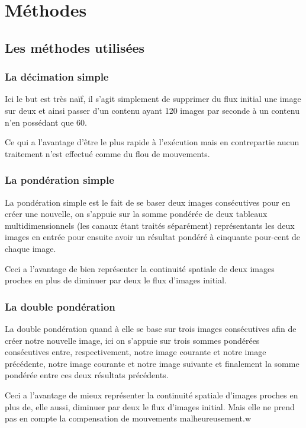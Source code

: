 \documentclass[fleqn,10pt]{SelfArx} %
\begin{document}

\section{Méthodes}

\subsection{Les méthodes utilisées}

\subsubsection{La décimation simple}
Ici le but est très naïf, il s'agit simplement de supprimer du flux initial une image sur deux et ainsi passer d'un contenu ayant 120 images par seconde à un contenu n'en possédant que 60.

Ce qui a l'avantage d'être le plus rapide à l'exécution mais en contrepartie aucun traitement n'est effectué comme du flou de mouvements.

\subsubsection{La pondération simple}
La pondération simple est le fait de se baser deux images consécutives pour en créer une nouvelle, on s'appuie sur la somme pondérée de deux tableaux multidimensionnels (les canaux étant traités séparément) représentants les deux images en entrée pour ensuite avoir un résultat pondéré à cinquante pour-cent de chaque image.

Ceci a l'avantage de bien représenter la continuité spatiale de deux images proches en plus de diminuer par deux le flux d'images initial.

\subsubsection{La double pondération}
La double pondération quand à elle se base sur trois images consécutives afin de créer notre nouvelle image, ici on s'appuie sur trois sommes pondérées consécutives entre, respectivement, notre image courante et notre image précédente, notre image courante et notre image suivante et finalement la somme pondérée entre ces deux résultats précédents.

Ceci a l'avantage de mieux représenter la continuité spatiale d'images proches en plus de, elle aussi, diminuer par deux le flux d'images initial. Mais elle ne prend pas en compte la compensation de mouvements malheureusement.w
\end{document}
